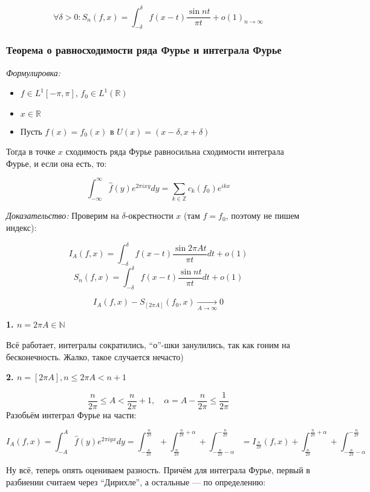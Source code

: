 \documentclass{article}
\def\goesto#1{\underset{#1}{\longrightarrow}}
\begin{document}
\[\forall \delta > 0: S_n(f, x) = \int_{-\delta}^{\delta} f(x - t)\frac{\sin nt}{\pi t} + o(1)_{n \rightarrow \infty}\]

\subsubsection{Теорема о равносходимости ряда Фурье и интеграла Фурье}
\textit{Формулировка:}

\begin{itemize}
    \item $f \in L^1[-\pi, \pi]$, $f_0 \in L^1(\mathbb{R})$
    \item $x \in \mathbb{R}$
    \item Пусть $f(x) = f_0(x)$ в $U(x) = (x - \delta, x + \delta)$
\end{itemize}

Тогда в точке $x$ сходимость ряда Фурье равносильна сходимости интеграла Фурье, и если она есть, то:

\[\int_{-\infty}^{\infty}\hat{f}(y)e^{2 \pi i x y }dy = \sum_{k \in \mathbb{Z}} c_k(f_0) e^{ikx}\]

\textit{Доказательство:}
Проверим на $\delta$-окрестности $x$ (там $f = f_0$, поэтому не пишем индекс):

\[I_A(f, x) = \int_{-\delta}^{\delta}f(x - t)\frac{\sin 2 \pi A t}{\pi t} dt + o(1)\]
\[S_n(f, x) = \int_{-\delta}^{\delta}f(x - t)\frac{\sin n t}{\pi t} dt + o(1)\]


\[I_A(f, x) - S_{[2\pi A]}(f_0, x) \goesto{A \rightarrow \infty} 0\]

\textbf{1. $n = 2 \pi A \in \mathbb{N}$}

Всё работает, интегралы сократились, ``о''-шки занулились, так как гоним на бесконечность. Жалко, такое случается нечасто)

\textbf{2. $n = [2 \pi A], n \le 2\pi A < n + 1$}

\[\frac{n}{2 \pi} \le A < \frac{n}{2\pi} + 1, \quad \alpha = A - \frac{n}{2 \pi} \le \frac{1}{2\pi}\]
Разобьём интеграл Фурье на части:

\[I_A(f, x) = \int_{-A}^{A} \hat{f}(y)e^{2 \pi i y x} dy = \int_{-\frac{n}{2 \pi}}^{\frac{n}{2\pi}} + \int_{\frac{n}{2\pi}}^{\frac{n}{2\pi} + \alpha} + \int_{-\frac{n}{2 \pi} - \alpha}^{-\frac{n}{2 \pi}} = I_{\frac{n}{2\pi}}(f, x) + \int_{\frac{n}{2\pi}}^{\frac{n}{2\pi} + \alpha} + \int_{-\frac{n}{2 \pi} - \alpha}^{-\frac{n}{2 \pi}} \]

Ну всё, теперь опять оцениваем разность. Причём для интеграла Фурье, первый в разбиении считаем через ``Дирихле'', а остальные --- по определению:
\end{document}
